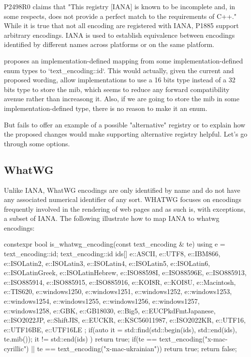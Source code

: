 \documentclass{wg21}
\begin{document}
P2498R0 claims that "This registry [IANA] is known to be incomplete and, in some respects, does not provide a perfect match to the requirements of C++."
While it is true that not all encoding are registered with IANA, P1885 support arbitrary encodings. IANA is used to establish equivalence between encodings identified by different names across platforms or on the same platform.

 proposes an implementation-defined mapping from some implementation-defined enum types to `text_encoding::id`.
This would actually, given the current and proposed wording, allow implementations to use a 16 bits type instead of a 32 bits type to store the mib,
which seems to reduce any forward compatibility avenue rather than increasong it. Also, if we are going to store the mib in some implementation-defined type, there is no reason to make it an enum.

But  fails to offer an example of a possible "alternative" registry or to explain how the proposed changes would make supporting alternative registry helpful. Let's go through some options.

\subsection{WhatWG}

Unlike IANA, WhatWG encodings are only identified by name and do not have any associated numerical identifier of any sort.
WHATWG focuses on encodings frequently involved in the rendering of web pages and as such is, with exceptions, a subset of IANA.
The following illustrate how to map IANA to whatwg encodings:

\begin{colorblock}
constexpr bool is_whatwg_encoding(const text_encoding & te) {
    using e = text_encoding::id;
    text_encoding::id ids[] {
        e::ASCII,
        e::UTF8, e::IBM866,
        e::ISOLatin2, e::ISOLatin3,
        e::ISOLatin4, e::ISOLatin5, e::ISOLatin6,
        e::ISOLatinGreek, e::ISOLatinHebrew,
        e::ISO88598I, e::ISO88596E,
        e::ISO885913, e::ISO885914,
        e::ISO885915, e::ISO885916,
        e::KOI8R, e::KOI8U,
        e::Macintosh, e::TIS620,
        e::windows1250, e::windows1251,
        e::windows1252, e::windows1253,
        e::windows1254, e::windows1255,
        e::windows1256, e::windows1257, e::windows1258,
        e::GBK, e::GB18030,
        e::Big5, e::EUCPkdFmtJapanese,
        e::ISO2022JP, e::ShiftJIS,
        e::EUCKR, e::KSC56011987,
        e::ISO2022KR,
        e::UTF16, e::UTF16BE, e::UTF16LE
    };
    if(auto it = std::find(std::begin(ids), std::end(ids), te.mib()); it != std::end(ids) )
        return true;
    if(te == text_encoding("x-mac-cyrillic") || te == text_encoding("x-mac-ukrainian"))
        return true;
    return false;
}
\end{colorblock}
\end{document}
